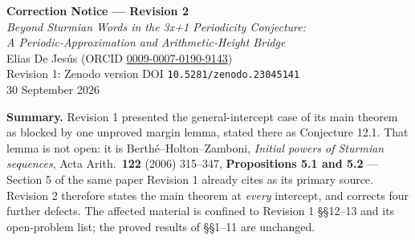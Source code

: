 \documentclass[11pt]{article}
\begin{document}
\begin{center}
{\large\bfseries Correction Notice --- Revision 2}\\[4pt]
{\itshape Beyond Sturmian Words in the 3x+1 Periodicity Conjecture:\\
A Periodic-Approximation and Arithmetic-Height Bridge}\\[3pt]
Elias De Jes\'us \quad (ORCID \href{https://orcid.org/0009-0007-0190-9143}{0009-0007-0190-9143})\\[3pt]
Revision 1: Zenodo version DOI \texttt{10.5281/zenodo.23045141}\\
30 September 2026
\end{center}

\noindent\textbf{Summary.} Revision 1 presented the general-intercept case of its main theorem as
blocked by one unproved margin lemma, stated there as Conjecture 12.1. That lemma is not open: it is
Berth\'e--Holton--Zamboni, \emph{Initial powers of Sturmian sequences}, Acta Arith.\ \textbf{122}
(2006) 315--347, \textbf{Propositions 5.1 and 5.2} --- Section 5 of the same paper Revision 1
already cites as its primary source. Revision 2 therefore states the main theorem at \emph{every}
intercept, and corrects four further defects. The affected material is confined to
Revision 1 \S\S12--13 and its open-problem list; the proved results of \S\S1--11 are unchanged.
\end{document}
